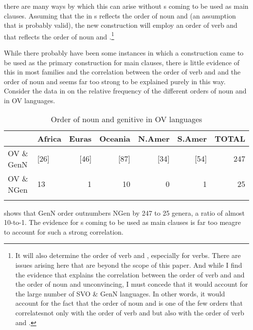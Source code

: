 \documentclass[output=paper]{langsci/langscibook}
\begin{document}
{there are many ways by which this can arise without s coming to be used as main clauses.} Assuming that the  in s reflects the order of noun and  (an assumption that is probably valid), the new construction will employ an order of verb and  that reflects the order of noun and .\footnote{It will also determine the order of verb and , especially for  verbs. There are issues arising here that are beyond the scope of this paper. And while I find the evidence that  explains the correlation between the order of verb and  and the order of noun and  unconvincing, I must concede that it would account for the large number of SVO \& GenN languages. In other words, it would account for the fact that the order of noun and  is one of the few orders that correlatesnot only with the order of verb and  but also with the order of verb and  \citep{Dryer2013_Six2}.}

While there probably have been some instances in which a  construction came to be used as the primary construction for main clauses, there is little evidence of this in most families and the correlation between the order of verb and  and the order of noun and  seems far too strong to be explained purely in this way. Consider the data in  on the relative frequency of the different orders of noun and  in OV languages.

\begin{table}
\begin{tabularx}{\textwidth}{Xlrrrrr}
\lsptoprule
& \bfseries Africa & \bfseries Euras & \bfseries Oceania & \bfseries N.Amer & \bfseries S.Amer & \bfseries TOTAL\\
\midrule
OV \& GenN & [26] & [46] & [87] & [34] & [54] & 247\\
OV \& NGen & 13 & 1 & 10 & 0 & 1 & 25\\
\lspbottomrule
\end{tabularx}
\caption{\label{tab:dryer:7}Order of noun and genitive in OV languages}
\end{table}

 shows that GenN order outnumbers NGen by 247 to 25 genera, a ratio of almost 10-to-1. The evidence for s coming to be used as main clauses is far too meagre to account for such a strong correlation.
\end{document}
